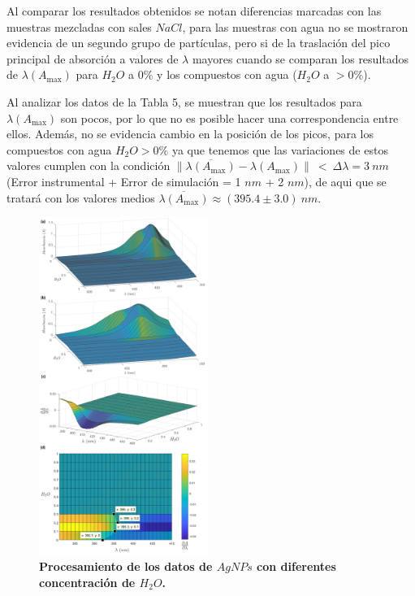 Al comparar los resultados obtenidos se notan diferencias marcadas con las muestras mezcladas con sales $NaCl$, para las muestras con agua no se mostraron evidencia de un segundo grupo de partículas, pero si de la traslación del pico principal de absorción a valores de $\lambda$ mayores cuando se comparan los resultados de $\lambda(A_{\max})$ para $H_2O$ a $0\%$ y los compuestos con agua ($H_2O$ a $>0\%$).

Al analizar los datos de la Tabla 5, se muestran que los resultados para $\lambda (A_{\max})$ son pocos, por lo que no es posible hacer una correspondencia entre ellos. Además, no se evidencia cambio en la posición de los picos, para los compuestos con agua $H_2O>0\%$ ya que tenemos que las variaciones de estos valores cumplen con la condición $ \|\overline{ \lambda (A_{\max}) }  - \lambda ( A_{\max})\|~ < ~\Delta\lambda=3 ~nm$  (Error instrumental + Error de simulación = 1 $nm$ + 2 $nm$), de aqui que se tratará con los valores medios $\overline{ \lambda ( A_{\max} )} \approx (395.4\pm 3.0)~nm$. 

\begin{figure}
    \includegraphics[width=0.49\textwidth]{Tarea3/AgNPs_H2O.png}
    \caption{\textbf{Procesamiento de los datos de $AgNPs$ con diferentes concentración de $H_2O$.}}
    \label{h2o}
\end{figure}

